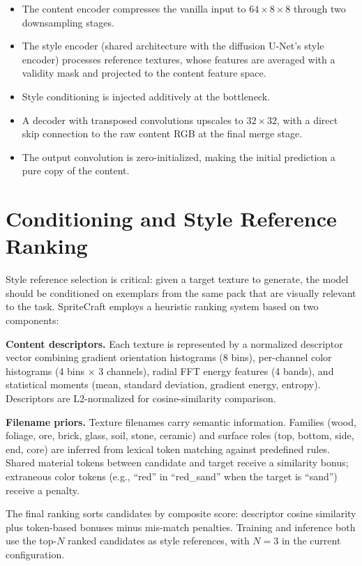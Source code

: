 \begin{itemize}
    \item The content encoder compresses the vanilla input to $64 \times 8 \times 8$ through two downsampling stages.
    \item The style encoder (shared architecture with the diffusion U-Net's style encoder) processes reference textures, whose features are averaged with a validity mask and projected to the content feature space.
    \item Style conditioning is injected additively at the bottleneck.
    \item A decoder with transposed convolutions upscales to $32\times32$, with a direct skip connection to the raw content RGB at the final merge stage.
    \item The output convolution is zero-initialized, making the initial prediction a pure copy of the content.
\end{itemize}

\section{Conditioning and Style Reference Ranking}

Style reference selection is critical: given a target texture to generate, the model should be conditioned on exemplars from the same pack that are visually relevant to the task. SpriteCraft employs a heuristic ranking system based on two components:

\textbf{Content descriptors.} Each texture is represented by a normalized descriptor vector combining gradient orientation histograms (8 bins), per-channel color histograms (4 bins $\times$ 3 channels), radial FFT energy features (4 bands), and statistical moments (mean, standard deviation, gradient energy, entropy). Descriptors are L2-normalized for cosine-similarity comparison.

\textbf{Filename priors.} Texture filenames carry semantic information. Families (wood, foliage, ore, brick, glass, soil, stone, ceramic) and surface roles (top, bottom, side, end, core) are inferred from lexical token matching against predefined rules. Shared material tokens between candidate and target receive a similarity bonus; extraneous color tokens (e.g., ``red'' in ``red\_sand'' when the target is ``sand'') receive a penalty.

The final ranking sorts candidates by composite score: descriptor cosine similarity plus token-based bonuses minus mis-match penalties. Training and inference both use the top-$N$ ranked candidates as style references, with $N=3$ in the current configuration.

